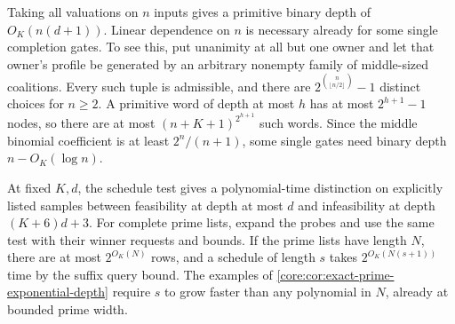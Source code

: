 Taking all valuations on $n$ inputs gives a primitive binary depth of
$O_K(n(d+1))$. Linear dependence on $n$ is necessary already for some
single completion gates. To see this, put unanimity at all but one
owner and let that owner's profile be generated by an arbitrary nonempty
family of middle-sized coalitions. Every such tuple is admissible, and
there are $2^{\binom n{\lfloor n/2\rfloor}}-1$ distinct choices for
$n\ge2$. A primitive word of depth at most $h$ has at most $2^{h+1}-1$
nodes, so there are at most $(n+K+1)^{2^{h+1}}$ such words. Since the
middle binomial coefficient is at least $2^n/(n+1)$, some single gates
need binary depth $n-O_K(\log n)$.

At fixed $K,d$, the schedule test gives a polynomial-time distinction
on explicitly listed samples between feasibility at depth at most $d$
and infeasibility at depth $(K+6)d+3$. For complete prime lists, expand
the probes and use the same test with their winner requests and bounds.
If the prime lists have length $N$, there are at most $2^{O_K(N)}$ rows,
and a schedule of length $s$ takes $2^{O_K(N(s+1))}$ time by the
suffix query bound. The examples of
\cref{core:cor:exact-prime-exponential-depth} require $s$ to grow
faster than any polynomial in $N$, already at bounded prime width.
